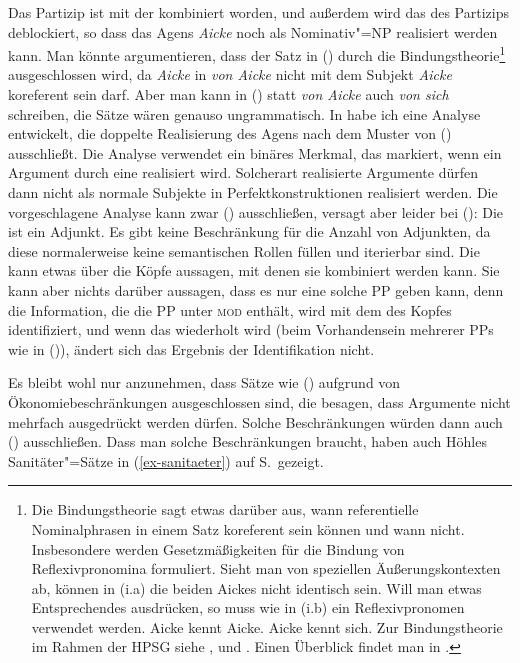 {
\z
Das Partizip ist mit der \vonpp kombiniert worden, und außerdem wird das \subj des Partizips
deblockiert, so dass das Agens \emph{Aicke} noch als Nominativ"=NP realisiert werden kann.
Man könnte argumentieren, dass der Satz in () durch die Bindungstheorie\footnote{
  Die Bindungstheorie sagt etwas darüber aus, wann referentielle Nominalphrasen in einem Satz
  koreferent sein können und wann nicht. Insbesondere werden Gesetzmäßigkeiten für die
  Bindung von Reflexivpronomina formuliert. Sieht man von speziellen Äußerungskontexten ab,
  können in (i.a) die beiden Aickes nicht identisch sein.
  Will man etwas Entsprechendes ausdrücken, so muss wie in (i.b) ein Reflexivpronomen verwendet werden.
\eal
\ex Aicke kennt Aicke.
\ex Aicke kennt sich.
\zl
  Zur Bindungstheorie im Rahmen der HPSG siehe \textcites{PS92a}[Kapitel~6]{ps2},
  \citet{Branco2002a} und \textcites[Kapitel~20]{Mueller99a}. Einen Überblick findet man in .%
} ausgeschlossen wird, da \emph{Aicke} in \emph{von Aicke} nicht mit dem Subjekt \emph{Aicke} koreferent sein darf.
Aber man kann in () statt \emph{von Aicke} auch \emph{von sich} schreiben, 
die Sätze wären genauso ungrammatisch. In  habe ich eine Analyse entwickelt,
die doppelte Realisierung des Agens nach dem Muster von () ausschließt. Die Analyse
verwendet ein binäres Merkmal, das markiert, wenn ein Argument durch eine \vonpp realisiert
wird. Solcherart realisierte Argumente dürfen dann nicht als normale Subjekte in Perfektkonstruktionen
realisiert werden. Die vorgeschlagene Analyse kann zwar () ausschließen, versagt aber
leider bei ():
\eal
{}
\zl
Die \vonpp ist ein Adjunkt. Es gibt keine Beschränkung für die Anzahl von Adjunkten, da
diese normalerweise keine semantischen Rollen füllen und iterierbar sind. Die \vonpp kann etwas über die Köpfe
aussagen, mit denen sie kombiniert werden kann. Sie kann aber nichts darüber aussagen, dass
es nur eine solche PP geben kann, denn die Information, die die PP unter \textsc{mod} enthält, wird mit dem
\synsemw des Kopfes identifiziert, und wenn das wiederholt wird (beim Vorhandensein mehrerer PPs wie
in ()), ändert sich das Ergebnis der Identifikation nicht.

Es bleibt wohl nur anzunehmen, dass Sätze wie () aufgrund von Ökonomiebeschränkungen
ausgeschlossen sind, die besagen, dass Argumente nicht mehrfach ausgedrückt werden dürfen.
Solche Beschränkungen würden dann auch () ausschließen. Dass man solche Beschränkungen
braucht, haben auch Höhles Sanitäter"=Sätze in (\ref{ex-sanitaeter}) auf S.\,\pageref{ex-sanitaeter} gezeigt.



}
